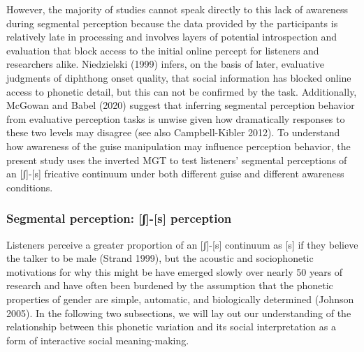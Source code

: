 \documentclass[
  letterpaper,
  DIV=11,
  numbers=noendperiod]{scrartcl}
\begin{document}
However, the majority of studies cannot speak directly to this lack of
awareness during segmental perception because the data provided by the
participants is relatively late in processing and involves layers of
potential introspection and evaluation that block access to the initial
online percept for listeners and researchers alike. Niedzielski (1999)
infers, on the basis of later, evaluative judgments of diphthong onset
quality, that social information has blocked online access to phonetic
detail, but this can not be confirmed by the task. Additionally, McGowan
and Babel (2020) suggest that inferring segmental perception behavior
from evaluative perception tasks is unwise given how dramatically
responses to these two levels may disagree (see also Campbell-Kibler
2012). To understand how awareness of the guise manipulation may
influence perception behavior, the present study uses the inverted MGT
to test listeners' segmental perceptions of an {[}ʃ{]}-{[}s{]} fricative
continuum under both different guise and different awareness conditions.

\subsubsection{Segmental perception: {[}ʃ{]}-{[}s{]}
perception}\label{sec-fricative-gender}

Listeners perceive a greater proportion of an {[}ʃ{]}-{[}s{]} continuum
as {[}s{]} if they believe the talker to be male (Strand 1999), but the
acoustic and sociophonetic motivations for why this might be have
emerged slowly over nearly 50 years of research and have often been
burdened by the assumption that the phonetic properties of gender are
simple, automatic, and biologically determined (Johnson 2005). In the
following two subsections, we will lay out our understanding of the
relationship between this phonetic variation and its social
interpretation as a form of interactive social meaning-making.
\end{document}
